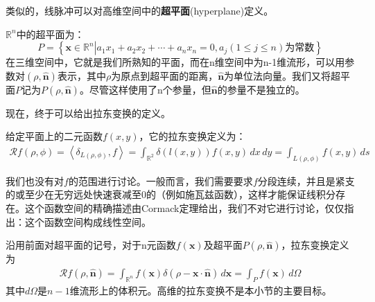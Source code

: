 类似的，线脉冲可以对高维空间中的\textbf{超平面}(hyperplane)定义。
\begin{definition}
$\mathbb{R}^n$中的超平面为：
\[P=\left\{\mathbf{x}\in\mathbb{R}^n\left|a_1 x_1+a_2 x_2+\cdots+a_n x_n=0,a_j(1\leq j\leq n)\text{为常数}\right.\right\}\]
在三维空间中，它就是我们所熟知的平面，而在n维空间中为n-1维流形，可以用参数对$(\rho,\hat{\mathbf{n}})$表示，其中$\rho$为原点到超平面的距离，$\hat{\mathbf{n}}$为单位法向量。我们又将超平面$P$记为$P(\rho,\hat{\mathbf{n}})$。尽管这样使用了n个参量，但$\hat{\mathbf{n}}$的参量不是独立的。
\end{definition}

现在，终于可以给出拉东变换的定义。
\begin{definition}[拉东变换]
    给定平面上的二元函数$f(x,y)$，它的拉东变换定义为：
    \begin{align*}
    \mathcal{R} f(\rho,\phi)=\left\langle \delta_{L(\rho,\phi)},f\right\rangle=\int_{\mathbb{R}^2}\delta(l(x,y))f(x,y)\,dx\,dy=\int_{L(\rho,\phi)}f(x,y)\,ds
    \end{align*}
\end{definition}
\begin{remark}
    我们也没有对$f$的范围进行讨论。一般而言，我们需要要求$f$分段连续，并且是紧支的或至少在无穷远处快速衰减至0的（例如施瓦兹函数），这样才能保证线积分存在。这个函数空间的精确描述由Cormack定理给出，我们不对它进行讨论，仅仅指出：这个函数空间构成线性空间。
\end{remark}
\begin{remark}
    沿用前面对超平面的记号，对于n元函数$f(\mathbf{x})$及超平面$P(\rho,\hat{\mathbf{n}})$，拉东变换定义为
    \begin{align*}
    \mathcal{R} f(\rho,\hat{\mathbf{n}})=\int_{\mathbb{R}^n}f(\mathbf{x})\delta(\rho-\mathbf{x}\cdot\hat{\mathbf{n}})\,d\mathbf{x}=\int_{P}f(\mathbf{x})\,d\Omega
    \end{align*}
    其中$d\Omega$是$n-1$维流形上的体积元。高维的拉东变换不是本小节的主要目标。
\end{remark}

